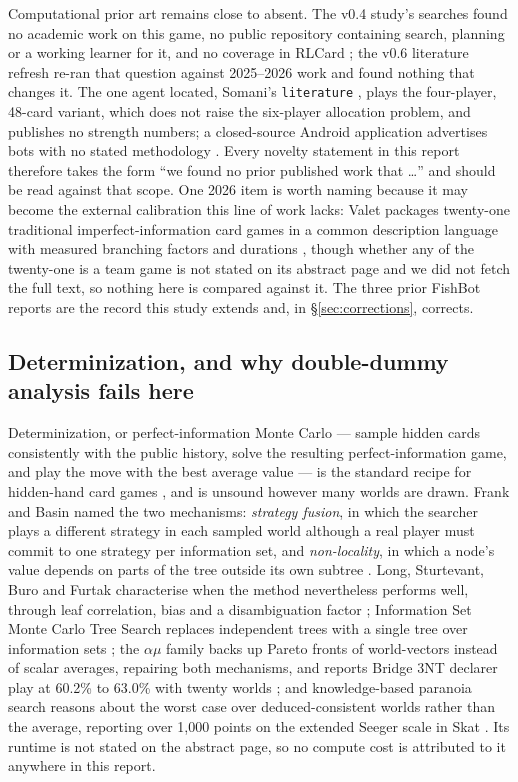 Computational prior art remains close to absent. The v0.4 study's searches found
no academic work on this game, no public repository containing search, planning
or a working learner for it, and no coverage in RLCard \cite{rlcard}; the v0.6
literature refresh re-ran that question against 2025--2026 work and found
nothing that changes it. The one agent located, Somani's \texttt{literature}
\cite{somani,somani-server}, plays the four-player, 48-card variant, which does
not raise the six-player allocation problem, and publishes no strength numbers;
a closed-source Android application advertises bots with no stated methodology
\cite{playstore}. Every novelty statement in this report therefore takes the
form ``we found no prior published work that \dots'' and should be read against
that scope. One 2026 item is worth naming because it may become the external
calibration this line of work lacks: Valet packages twenty-one traditional
imperfect-information card games in a common description language with measured
branching factors and durations \cite{goadrich2026valet}, though whether any of
the twenty-one is a team game is not stated on its abstract page and we did not
fetch the full text, so nothing here is compared against it. The three prior
FishBot reports \cite{fishbot03,fishbot04,fishbot05} are the record this study
extends and, in \S\ref{sec:corrections}, corrects.

\subsection{Determinization, and why double-dummy analysis fails here}
\label{sec:related-determinization}

Determinization, or perfect-information Monte Carlo --- sample hidden cards
consistently with the public history, solve the resulting perfect-information
game, and play the move with the best average value --- is the standard recipe
for hidden-hand card games \cite{levy,ginsberg-gib}, and is unsound however many
worlds are drawn. Frank and Basin named the two mechanisms: \emph{strategy
fusion}, in which the searcher plays a different strategy in each sampled world
although a real player must commit to one strategy per information set, and
\emph{non-locality}, in which a node's value depends on parts of the tree
outside its own subtree \cite{frank-basin-ai,frank-basin-aaai}. Long, Sturtevant,
Buro and Furtak characterise when the method nevertheless performs well, through
leaf correlation, bias and a disambiguation factor \cite{long-pimc}; Information
Set Monte Carlo Tree Search replaces independent trees with a single tree over
information sets \cite{cowling-ismcts,goodman-ris}; the $\alpha\mu$ family backs
up Pareto fronts of world-vectors instead of scalar averages, repairing both
mechanisms, and reports Bridge 3NT declarer play at 60.2\% to 63.0\% with twenty
worlds \cite{cazenave2019alphamu}; and knowledge-based paranoia search reasons
about the worst case over deduced-consistent worlds rather than the average,
reporting over 1,000 points on the extended Seeger scale in Skat
\cite{edelkamp2021paranoia}. Its runtime is not stated on the abstract page, so
no compute cost is attributed to it anywhere in this report.

